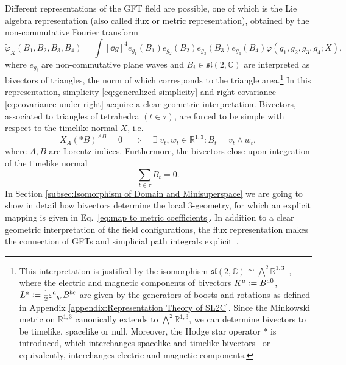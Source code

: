 \documentclass[11pt,a4paper]{article}
\newcommand{\R}{\mathbb R}
\newcommand{\C}{\mathbb C}
\newcommand{\spl}{\mathfrak{sl}\left(2,\C\right)}
\newcommand{\defeq}{\vcentcolon=}
\begin{document}
Different representations of the GFT field are possible, one of which is the Lie algebra representation (also called flux or metric representation), obtained by the non-commutative Fourier transform~\cite{Baratin:2010wi,Guedes:2013vi,Oriti:2018bwr}
%
\begin{equation}
\tilde{\varphi}_X(B_1, B_2, B_3, B_4)
=
\int\left[\dd{g}\right]^4 e_{g_1}(B_1)e_{g_2}(B_2)e_{g_3}(B_3)e_{g_4}(B_4)\varphi(g_1,g_2,g_3,g_4;X),
\end{equation}
%
where $e_{g_i}$ are non-commutative plane waves and $B_i\in\spl$ are interpreted as bivectors of triangles, the norm of which corresponds to the triangle area.\footnote{This interpretation is justified by the isomorphism $\spl\cong\bigwedge^2\R^{1,3}$~\cite{Pereira:2010wzm}, where the electric and magnetic components of bivectors $K^a\defeq B^{a0}$, $L^a\defeq \frac{1}{2}\tensor{\varepsilon}{^a_{bc}}B^{bc}$ are given by the generators of boosts and rotations as defined in Appendix \ref{appendix:Representation Theory of SL2C}. Since the Minkowski metric on $\R^{1,3}$ canonically extends to $\bigwedge^2\R^{1,3}$, we can determine bivectors to be timelike, spacelike or null. Moreover, the Hodge star operator $*$ is introduced, which interchanges spacelike and timelike bivectors~\cite{Barrett:1999qw} or equivalently, interchanges electric and magnetic components.} In this representation, simplicity \eqref{eq:generalized simplicity} and right-covariance \eqref{eq:covariance under right} acquire a clear geometric interpretation. Bivectors, associated to triangles of tetrahedra $(t\in\tau)$, are forced to be simple with respect to the timelike normal $X$, i.e.
%
\begin{equation}\label{eq:simplicity on bivectors}
X_A (*B)^{AB} =  0\quad\Rightarrow\quad 
\exists\; v_t,w_t\in\R^{1,3}:B_t=v_t\wedge w_t,
\end{equation}
%
where $A,B$ are Lorentz indices. Furthermore, the bivectors close upon integration of the timelike normal 
%
\begin{equation}
\sum_{t\in\tau}B_t = 0.
\end{equation}
%
In Section \ref{subsec:Isomorphism of Domain and Minisuperspace} we are going to show in detail how bivectors determine the local $3$-geometry, for which an explicit mapping is given in Eq.~\eqref{eq:map to metric coefficients}. 
In addition to a clear geometric interpretation of the field configurations, the flux representation makes the connection of GFTs and simplicial path integrals explicit~\cite{Oriti:2011jm, Finocchiaro:2018hks}. 
\end{document}
